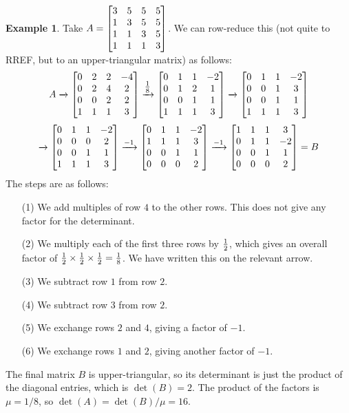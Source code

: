 \documentclass[reqno]{amsart}
\theoremstyle{definition}
\newtheorem{example}[theorem]{Example}
\begin{document}
\begin{example}\label{eg-det-ro-i}
 Take $A=\left[\begin{matrix} 3&5&5&5 \\ 1&3&5&5 \\ 1&1&3&5 \\ 1&1&1&3 \end{matrix}\right]$.  We can
 row-reduce this (not quite to RREF, but to an upper-triangular matrix)
 as follows:
 \[ A
  \xrightarrow{}
  \left[\begin{matrix} 0&2&2&-4 \\
       0&2&4&2 \\
       0&0&2&2 \\
       1&1&1&3 \end{matrix}\right]
  \xrightarrow{\tfrac{1}{8}}
  \left[\begin{matrix} 0&1&1&-2 \\
       0&1&2&1 \\
       0&0&1&1 \\
       1&1&1&3 \end{matrix}\right]
  \xrightarrow{}
  \left[\begin{matrix} 0&1&1&-2 \\
       0&0&1&3 \\
       0&0&1&1 \\
       1&1&1&3 \end{matrix}\right]
 \] \[
  \xrightarrow{}
  \left[\begin{matrix} 0&1&1&-2 \\
       0&0&0&2 \\
       0&0&1&1 \\
       1&1&1&3 \end{matrix}\right]
  \xrightarrow{-1}
  \left[\begin{matrix} 0&1&1&-2 \\
       1&1&1&3 \\
       0&0&1&1 \\
       0&0&0&2 \end{matrix}\right]
  \xrightarrow{-1}
  \left[\begin{matrix} 1&1&1&3 \\
       0&1&1&-2 \\
       0&0&1&1 \\
       0&0&0&2 \end{matrix}\right]
   = B
 \]
 The steps are as follows:
 \begin{itemize}
  \item[(1)] We add multiples of row $4$ to the other rows.  This does
   not give any factor for the determinant.
  \item[(2)] We multiply each of the first three rows by $\tfrac{1}{2}$, which
   gives an overall factor of $\tfrac{1}{2}\times\tfrac{1}{2}\times\tfrac{1}{2}=\frac{1}{8}$.  We
   have written this on the relevant arrow.
  \item[(3)] We subtract row $1$ from row $2$.
  \item[(4)] We subtract row $3$ from row $2$.
  \item[(5)] We exchange rows $2$ and $4$, giving a factor of $-1$.
  \item[(6)] We exchange rows $1$ and $2$, giving another factor of $-1$.
 \end{itemize}
 The final matrix $B$ is upper-triangular, so its determinant is just
 the product of the diagonal entries, which is $\det(B)=2$.  The
 product of the factors is $\mu=1/8$, so $\det(A)=\det(B)/\mu=16$.
\end{example}
\end{document}
